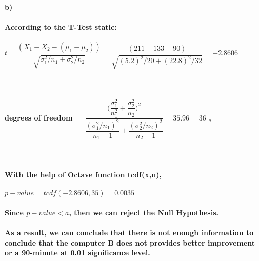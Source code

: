 \documentclass[12pt]{article}
\begin{document}
\paragraph{b)
\\\\ According to the T-Test static:
\\\\ $ t= \dfrac{(\bar{X_{1}} - \bar{X_{2}} - (\mu_{1} - \mu_{2}))}{\sqrt{\sigma_{1}^2/n_{1} + \sigma_{2}^2/n_{2}}}  = \dfrac{(211 - 133 - 90)}{\sqrt{(5.2)^2 /20 + (22.8)^2 / 32}} = -2.8606$\\\\
\\\\ degrees of freedom $ =\dfrac{\Big(\dfrac{\sigma_{1}^2}{n_{1}^2} + \dfrac{\sigma_{2}^2}{n_{2}}\Big)^2}{\dfrac{(\sigma_{1}^2 / n_{1})^2}{n_{1}-1} + \dfrac{(\sigma_{2}^2 / n_{2})^2}{n_{2}-1}}= 35.96 = 36$ ,\\\\
\\\\ With the help of Octave function tcdf(x,n),
\\\\ {\hspace*{25}} $p-value = tcdf(-2.8606,35) = 0.0035$
\\\\ Since  $p-value < a $, then we can reject the Null Hypothesis. 
\\\\ As a result, we can conclude that there is not enough information to conclude that the computer B does not provides better improvement or a 90-minute at 0.01 significance level.
}
\end{document}
